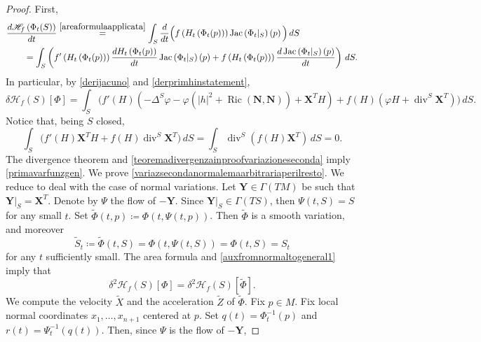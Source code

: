 \documentclass[11pt]{amsart}
\newcommand{\n}[1]{\nabla^\varepsilon_{ #1 }}
\newcommand{\tmc}{{\mathscr{H}}}
\newcommand{\W}{\mathbf Y}
\newcommand{\X}{\mathbf{X}}
\renewcommand{\n}{\mathbf{N}}
\DeclareMathOperator{\ric}{Ric}
\DeclareMathOperator{\divv}{div}
\DeclareMathOperator{\jac}{Jac}
\theoremstyle{definition}
\theoremstyle{remark}
\numberwithin{equation}{section}
\begin{document}
\begin{proof}
    First,
    \begin{equation*}
        \begin{split}
              &\frac{d\tmc_f\left(\Phi_t(S)\right)}{dt}\overset{\eqref{areaformulaapplicata}}{=}\int_S\frac{d}{dt}\Big(f\left(H_t\left(\Phi_t(p)\right)\right)\jac\left(\Phi_t|_{S}\right)\left(p\right)\Big)\,dS\\
              &\qquad=\int_S \left(f'\left(H_t\left(\Phi_t(p)\right)\right)\frac{d H_t\left(\Phi_t(p)\right)}{dt}\jac\left(\Phi_t|_{S}\right)\left(p\right)+f\left(H_t\left(\Phi_t(p)\right)\right)\frac{d \jac\left(\Phi_t|_{S}\right)\left(p\right)}{dt}\right)\,dS.\\
        \end{split}
    \end{equation*}
    In particular, by \eqref{derijacuno} and \eqref{derprimhinstatement},
    \begin{equation*}
        \delta\tmc_f(S)[\Phi]=\int_S\Big(f'(H)\left(-\Delta^S\varphi-\varphi\left(|h|^2+\ric(\n,\n)\right)+ \X^T H\right)+f(H)\left(\varphi H+\divv^S\X^T\right)\Big)\,dS.
    \end{equation*}
    Notice that, being $S$ closed,
    \begin{equation}\label{teoremadivergenzainproofvariazioneseconda}
        \int_S\Big( f'(H)\X^T H+f(H)\divv^S\X^T\Big)\,dS=\int_S\divv^S\left(f(H)\X^T\right)\,dS=0. 
    \end{equation}
The divergence theorem and \eqref{teoremadivergenzainproofvariazioneseconda} imply \eqref{primavarfunzgen}. We prove \eqref{variazsecondanormalemaarbitrariaperilresto}.
    We reduce to deal with the case of normal variations. Let $\W\in\Gamma(TM)$ be such that $\W|_S=\X^T$. Denote by $\Psi$ the flow of $-\W$. Since $\W|_S\in\Gamma(TS)$, then $\Psi(t,S)=S$ for any small $t$. Set $\tilde\Phi(t,p)\coloneqq\Phi(t,\Psi(t,p))$. Then $\tilde \Phi$ is a smooth variation, and moreover
    \begin{equation}\label{auxfromnormaltogeneral1}
        \tilde S_t\coloneqq\tilde\Phi(t,S)=\Phi(t,\Psi(t,S))=\Phi(t,S)=S_t
    \end{equation}
    for any $t$ sufficiently small. The area formula and \eqref{auxfromnormaltogeneral1} imply that 
    \begin{equation}\label{auxfromnormaltogeneraltre}
        \delta^2\tmc_f(S)[\Phi]=\delta^2\tmc_f(S)[\tilde \Phi].
    \end{equation} We compute the velocity $\tilde X$ and the acceleration $\tilde Z$ of $\tilde\Phi$. Fix $p\in M$. Fix local normal coordinates $x_1,\ldots,x_{n+1}$ centered at $p$. Set $q(t)=\Phi_t^{-1}(p)$ and $r(t)=\Psi^{-1}_t(q(t)).$ Then, since $\Psi$ is the flow of $-\W$, 

\end{proof}
\end{document}
